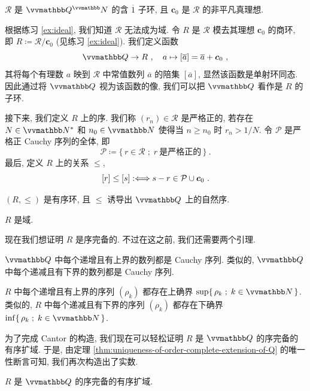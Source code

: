 \begin{lemma}
    \(\mathcal R\) 是 \(\Q^\N\) 的含 \(\overline 1\) 子环, 且 \(\bm c_0\) 是 \(\mathcal R\) 的非平凡真理想.
\end{lemma}

根据练习 \ref{ex:ideal}, 我们知道 \(\mathcal R\) 无法成为域. 令 \(R\) 是 \(\mathcal R\) 模去其理想 \(\bm c_0\) 的商环, 即 \(R \coloneqq \mathcal R / \bm c_0\) (见练习 \ref{ex:ideal}). 我们定义函数
\[
    \Q \to R\ ,\quad a \mapsto [\overline a] = \overline a + \bm c_0\ ,
\]
其将每个有理数 \(a\) 映到 \(\mathcal R\) 中常值数列 \(\overline a\) 的陪集 \([\overline a]\), 显然该函数是单射环同态. 因此通过将 \(\Q\) 视为该函数的像, 我们可以把 \(\Q\) 看作是 \(R\) 的子环.

接下来, 我们定义 \(R\) 上的序. 我们称 \((r_n) \in \mathcal R\) 是严格正的, 若存在 \(N \in \N^\ast\) 和 \(n_0 \in \N\) 使得当 \(n \geq n_0\) 时 \(r_n > 1 / N\). 令 \(\mathcal P\) 是严格正 Cauchy 序列的全体, 即
\[
    \mathcal P \coloneqq \{\, r \in \mathcal R \;;\; r\ \text{是严格正的} \,\}\ .
\]
最后, 定义 \(R\) 上的关系 \(\leq\),
\[
    [r] \leq [s] :\Longleftrightarrow s - r \in \mathcal P \cup \bm c_0\ .
\]

\begin{lemma}
    \((R, \leq)\) 是有序环, 且 \(\leq\) 诱导出 \(\Q\) 上的自然序.
\end{lemma}

\begin{proposition}
    \(R\) 是域.
\end{proposition}

现在我们想证明 \(R\) 是序完备的. 不过在这之前, 我们还需要两个引理.

\begin{lemma}
    \(\Q\) 中每个递增且有上界的数列都是 Cauchy 序列. 类似的, \(\Q\) 中每个递减且有下界的数列都是 Cauchy 序列.
\end{lemma}

\begin{lemma}
    \(R\) 中每个递增且有上界的序列 \((\rho_k)\) 都存在上确界 \(\sup\{\, \rho_k \;;\; k \in \N \,\}\). 类似的, \(R\) 中每个递减且有下界的序列 \((\rho_k)\) 都存在下确界 \(\inf\{\, \rho_k \;;\; k \in \N \,\}\).
\end{lemma}

为了完成 Cantor 的构造, 我们现在可以轻松证明 \(R\) 是 \(\Q\) 的序完备的有序扩域. 于是, 由定理 \ref{thm:uniqueness-of-order-complete-extension-of-Q} 的唯一性断言可知, 我们再次构造出了实数.

\begin{theorem}
    \(R\) 是 \(\Q\) 的序完备的有序扩域.
\end{theorem}

